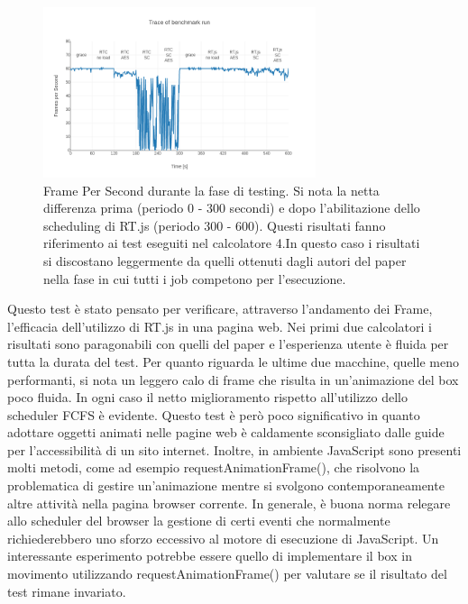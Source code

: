 \documentclass[conference]{IEEEtran}
\begin{document}
    \begin{figure}[hbt!]
    \includegraphics[width=8cm]{qualitative_4.png}
    \centering
    \caption{Frame Per Second durante la fase di testing. Si nota la netta differenza prima (periodo 0 - 300 secondi) e dopo l’abilitazione dello scheduling di RT.js (periodo 300 - 600). Questi risultati fanno riferimento ai test eseguiti nel calcolatore 4.In questo caso i risultati si discostano leggermente da quelli ottenuti dagli autori del paper nella fase in cui tutti i job competono per l'esecuzione.}
    \end{figure}
    \newpage
    Questo test è stato pensato per verificare, attraverso l'andamento dei Frame, l'efficacia dell'utilizzo di RT.js in una pagina web. Nei primi due calcolatori i risultati sono paragonabili con quelli del paper e l'esperienza utente è fluida per tutta la durata del test. Per quanto riguarda le ultime due macchine, quelle meno performanti, si nota un leggero calo di frame che risulta in un'animazione del box poco fluida. 
    \newline
    In ogni caso il netto miglioramento rispetto all'utilizzo dello scheduler FCFS è evidente. Questo test è però poco significativo in quanto adottare oggetti animati nelle pagine web è caldamente sconsigliato dalle guide per l'accessibilità di un sito internet. Inoltre, in ambiente JavaScript sono presenti molti metodi, come ad esempio requestAnimationFrame(), che risolvono la problematica di gestire un'animazione mentre si svolgono contemporaneamente altre attività nella pagina browser corrente. In generale, è buona norma relegare allo scheduler del browser la gestione di certi eventi che normalmente richiederebbero uno sforzo eccessivo al motore di esecuzione di JavaScript. Un interessante esperimento potrebbe essere quello di implementare il box in movimento utilizzando requestAnimationFrame() per valutare se il risultato del test rimane invariato.
\end{document}
